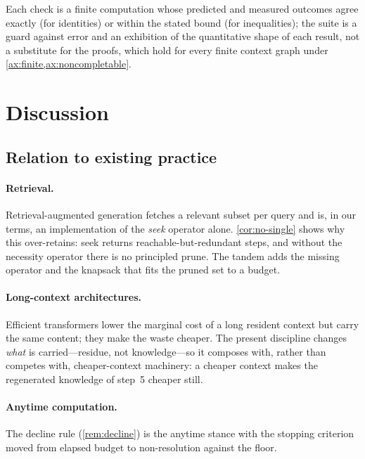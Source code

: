 \documentclass[11pt,a4paper]{article}
\theoremstyle{thmstyle}
\theoremstyle{definition}
\theoremstyle{remark}
\begin{document}
Each check is a finite computation whose predicted and measured outcomes agree
exactly (for identities) or within the stated bound (for inequalities); the
suite is a guard against error and an exhibition of the quantitative shape of
each result, not a substitute for the proofs, which hold for every finite context
graph under \cref{ax:finite,ax:noncompletable}.

\section{Discussion}
\label{sec:discussion}

\subsection{Relation to existing practice}

\paragraph{Retrieval.} Retrieval-augmented generation \citep{lewis2020} fetches a
relevant subset per query and is, in our terms, an implementation of the
\emph{seek} operator alone. \cref{cor:no-single} shows why this over-retains: seek
returns reachable-but-redundant steps, and without the necessity operator there
is no principled prune. The tandem adds the missing operator and the knapsack
that fits the pruned set to a budget.

\paragraph{Long-context architectures.} Efficient transformers \citep{tay2022}
lower the marginal cost of a long resident context but carry the same content;
they make the waste cheaper. The present discipline changes \emph{what} is
carried---residue, not knowledge---so it composes with, rather than competes
with, cheaper-context machinery: a cheaper context makes the regenerated
knowledge of step~5 cheaper still.

\paragraph{Anytime computation.} The decline rule (\cref{rem:decline}) is the
anytime stance \citep{dean1988,zilberstein1996} with the stopping criterion moved
from elapsed budget to non-resolution against the floor.
\end{document}
